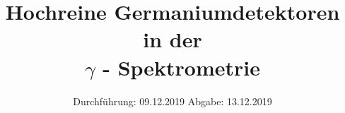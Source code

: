 
\usepackage{longtable}
\usepackage{wrapfig}
\usepackage{ dsfont }
\subject{VERSUCH 18}
\title{Hochreine Germaniumdetektoren in der\\ \texorpdfstring{$\gamma$}. - Spektrometrie}
\date{%
  \hspace{-2.5em}
  Durchführung: 09.12.2019
  \hspace{4em}
  Abgabe: 13.12.2019
}


  \setlength{\parindent}{0em}
  \maketitle
  \thispagestyle{empty}
  \newpage
  \tableofcontents
  \newpage




%
\printbibliography{}
%


